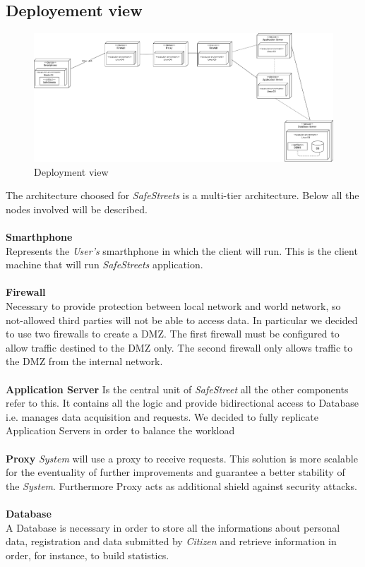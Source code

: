\documentclass{article}
\begin{document}
\clearpage

\subsection{Deployement view}
\begin{figure}[H]
    \centering
    \includegraphics[scale=0.3]{img/Deployment_component.png}
    \caption{Deployment view}
\end{figure}  
The architecture choosed for \textit{SafeStreets} is a multi-tier architecture. Below all the nodes 
involved will be described.
\\
\\
\textbf{Smarthphone}\\
Represents the \textit{User's} smarthphone in which the client will run. This is the client machine
that will run \textit{SafeStreets} application.
\\
\\
\textbf{Firewall}\\
Necessary to provide protection between local network and world network, so not-allowed third parties will not be 
able to access data. In particular we decided to use two firewalls to create a DMZ. The first firewall must be configured 
to allow traffic destined to the DMZ only. The second firewall only allows traffic to the DMZ from the internal network.
\\
\\
\textbf{Application Server}
Is the central unit of \textit{SafeStreet} all the other components refer to this. It contains all
the logic and provide bidirectional access to Database i.e. manages data acquisition and requests.
We decided to fully replicate Application Servers in order to balance the workload 
\\
\\
\textbf{Proxy}
\textit{System} will use a proxy to receive requests. This solution is more scalable for the eventuality
of further improvements and guarantee a better stability of the \textit{System}. Furthermore Proxy acts as
additional shield against security attacks.  
\\
\\
\textbf{Database}\\
A Database is necessary in order to store all the informations about personal data, registration and 
data submitted by \textit{Citizen} and retrieve information in order, for instance, to build statistics.
\end{document}
